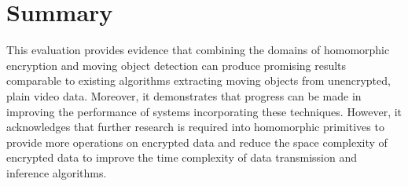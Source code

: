 \setlength{\leftskip}{0cm}




\section{Summary}
\setlength{\leftskip}{0.25cm}
\indent \indent
This evaluation provides evidence that combining the domains of homomorphic encryption and moving object detection can produce promising results comparable to existing algorithms extracting moving objects from unencrypted, plain video data. Moreover, it demonstrates that progress can be made in improving the performance of systems incorporating these techniques. However, it acknowledges that further research is required into homomorphic primitives to provide more operations on encrypted data and reduce the space complexity of encrypted data to improve the time complexity of data transmission and inference algorithms.

\setlength{\leftskip}{0cm}
